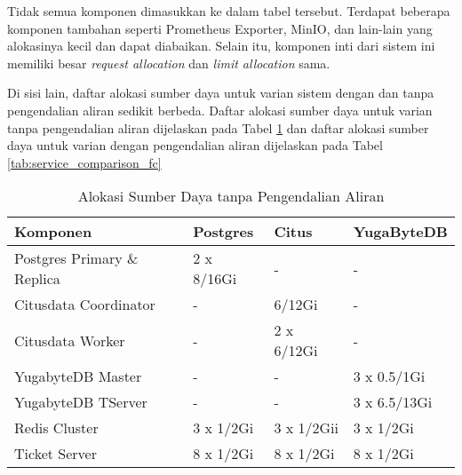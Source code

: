Tidak semua komponen dimasukkan ke dalam tabel tersebut. Terdapat beberapa komponen tambahan seperti Prometheus Exporter, MinIO, dan lain-lain yang alokasinya kecil dan dapat diabaikan. Selain itu, komponen inti dari sistem ini memiliki besar \textit{request allocation} dan \textit{limit allocation} sama.

Di sisi lain, daftar alokasi sumber daya untuk varian sistem dengan dan tanpa pengendalian aliran sedikit berbeda. Daftar alokasi sumber daya untuk varian tanpa pengendalian aliran dijelaskan pada Tabel \ref{tab:nofc-allocation} dan daftar alokasi sumber daya untuk varian dengan pengendalian aliran dijelaskan pada Tabel \ref{tab:service_comparison_fc}


\begin{table}[htbp]
    \centering
    \caption{Alokasi Sumber Daya tanpa Pengendalian Aliran}
    \label{tab:nofc-allocation}
    \begin{tabular}{|l|l|l|l|}
        \hline
        \textbf{Komponen}           & \textbf{Postgres} & \textbf{Citus} & \textbf{YugaByteDB} \\ \hline
        Postgres Primary \& Replica & 2 x 8/16Gi        & -              & -                   \\ \hline
        Citusdata Coordinator       & -                 & 6/12Gi         & -                   \\ \hline
        Citusdata Worker            & -                 & 2 x 6/12Gi     & -                   \\ \hline
        YugabyteDB Master           & -                 & -              & 3 x 0.5/1Gi         \\ \hline
        YugabyteDB TServer          & -                 & -              & 3 x 6.5/13Gi        \\ \hline
        Redis Cluster               & 3 x 1/2Gi         & 3 x 1/2Gii     & 3 x 1/2Gi           \\ \hline
        Ticket Server               & 8 x 1/2Gi         & 8 x 1/2Gi      & 8 x 1/2Gi           \\ \hline
    \end{tabular}
\end{table}

\pagebreak

